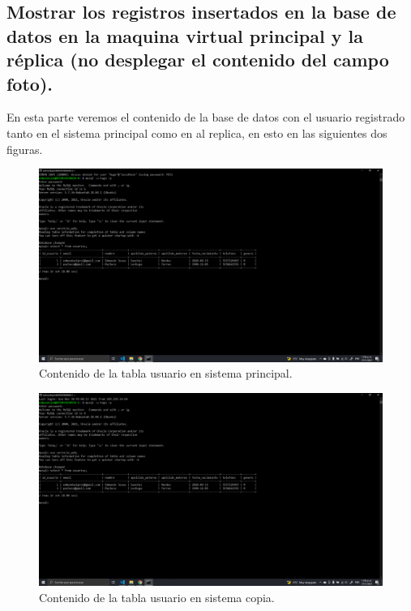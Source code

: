 \documentclass[11pt]{article}
\begin{document}
		\subsection{Mostrar los registros insertados en la base de datos en la maquina virtual principal y la réplica (no desplegar el contenido del campo foto).}
		En esta parte veremos el contenido de la base de datos con el usuario registrado tanto en el sistema principal como en al replica, en esto en las siguientes dos figuras.
		\begin{figure}[H]
			\centering
			\includegraphics[scale=0.34]{resources/p9.3principal.png}
			\caption{Contenido de la tabla usuario en sistema principal.}\label{fig:picture}
		\end{figure}	
		\begin{figure}[H]
			\centering
			\includegraphics[scale=0.34]{resources/p9.3copia.png}
			\caption{Contenido de la tabla usuario en sistema copia.}\label{fig:picture}
		\end{figure}	
\end{document}
